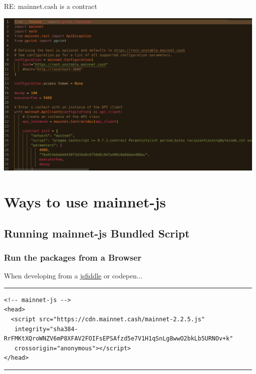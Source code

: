 \documentclass{beamer}
\begin{document}
\begin{frame}{RE: mainnet.cash is a contract}{}

  \includegraphics[width=1\textwidth, angle=0]{python_perp.png}
\end{frame}



\section{Ways to use mainnet-js}

\subsection[Javascript]{Running mainnet-js Bundled Script}

\begin{frame}[fragile]
    \frametitle{Run the packages from a Browser}
    When developing from a \href{https://jsfiddle.net/bdqujn25/}{jsfiddle} or codepen...

    
    \rule{\textwidth}{0.4pt}
    \tiny
    \begin{verbatim}
<!-- mainnet-js -->
<head>
  <script src="https://cdn.mainnet.cash/mainnet-2.2.5.js"
   integrity="sha384-RrFMKtXQroWNZV6mP8XFAV2FOIFsEPSAfzd5e7V1H1qSnLg8wwO2bkLb5URNOv+k"
   crossorigin="anonymous"></script>
</head>
    \end{verbatim}
\rule{\textwidth}{0.4pt}
\end{frame}
\end{document}
